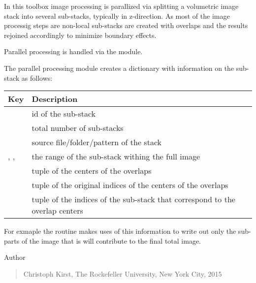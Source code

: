\documentclass[letterpaper,10pt,english]{sphinxmanual}
\begin{document}
In this toolbox image processing is parallized via splitting a volumetric
image stack into several sub-stacks, typically in z-direction. As most of
the image processig steps are non-local sub-stacks are created with overlaps
and the results rejoined accordingly to minimize boundary effects.

Parallel processing is handled via the
{\hyperref[api/ClearMap.ImageProcessing:module-ClearMap.ImageProcessing.StackProcessing]{\emph{}}} module.

The parallel processing module creates a dictionary with information on
the sub-stack as follows:
\label{api/ClearMap.ImageProcessing:substack}
\begin{tabulary}{\linewidth}{|L|L|}
\hline
\textsf{\relax 
Key
} & \textsf{\relax 
Description
}\\
\hline
{}
 & 
id of the sub-stack
\\
\hline
{}
 & 
total number of sub-stacks
\\
\hline
{}
 & 
source file/folder/pattern of the stack
\\
\hline
{}, , 
 & 
the range of the sub-stack withing the full image
\\
\hline
{}
 & 
tuple of the centers of the overlaps
\\
\hline
{}
 & 
tuple of the original indices of the centers of
the overlaps
\\
\hline
{}
 & 
tuple of the indices of the sub-stack that
correspond to the overlap centers
\\
\hline\end{tabulary}


For exmaple the {\hyperref[api/ClearMap.ImageProcessing:ClearMap.ImageProcessing.StackProcessing.writeSubStack]{\emph{}}} routine makes uses of this information
to write out only the sub-parts of the image that is will contribute to the
final total image.

Author
\begin{quote}

Christoph Kirst, The Rockefeller University, New York City, 2015
\end{quote}
\end{document}
